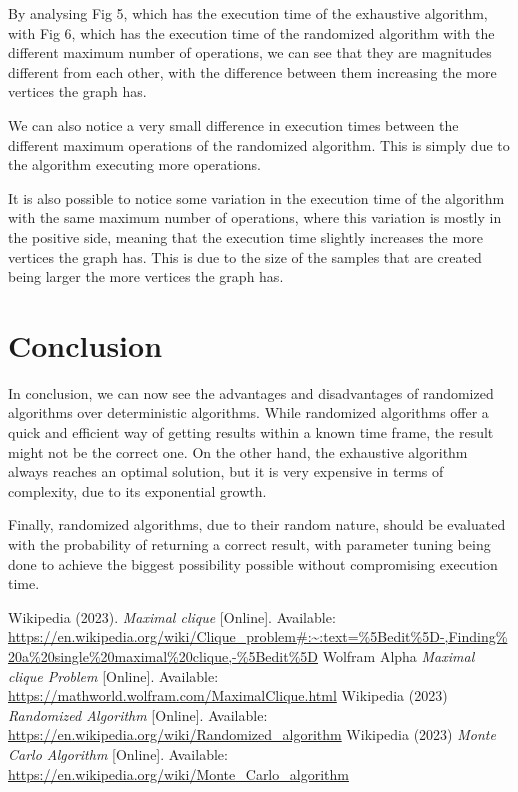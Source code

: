 \documentclass[]{revdetua}
\begin{document}
By analysing Fig 5, which has the execution time of the exhaustive algorithm, with Fig 6, which has the execution time of the randomized algorithm with the different maximum number of operations, we can see that they are magnitudes different from each other, with the difference between them increasing the more vertices the graph has.

We can also notice a very small difference in execution times between the different maximum operations of the randomized algorithm. This is simply due to the algorithm executing more operations.

It is also possible to notice some variation in the execution time of the algorithm with the same maximum number of operations, where this variation is mostly in the positive side, meaning that the execution time slightly increases the more vertices the graph has. This is due to the size of the samples that are created being larger the more vertices the graph has.

\section{Conclusion}

In conclusion, we can now see the advantages and disadvantages of randomized algorithms over deterministic algorithms. While randomized algorithms offer a quick and efficient way of getting results within a known time frame, the result might not be the correct one. On the other hand, the exhaustive algorithm always reaches an optimal solution, but it is very expensive in terms of complexity, due to its exponential growth.

Finally, randomized algorithms, due to their random nature, should be evaluated with the probability of returning a correct result, with parameter tuning being done to achieve the biggest possibility possible without compromising execution time.

\begin{thebibliography}{00}

 Wikipedia (2023). \textit{Maximal clique} [Online]. Available: \url{https://en.wikipedia.org/wiki/Clique_problem#:~:text=%5Bedit%5D-,Finding%20a%20single%20maximal%20clique,-%5Bedit%5D}
 Wolfram Alpha \textit{Maximal clique Problem} [Online]. Available: \url{https://mathworld.wolfram.com/MaximalClique.html}
 Wikipedia (2023) \textit{Randomized Algorithm} [Online]. Available: \url{https://en.wikipedia.org/wiki/Randomized_algorithm}
 Wikipedia (2023) \textit{Monte Carlo Algorithm} [Online]. Available: \url{https://en.wikipedia.org/wiki/Monte_Carlo_algorithm}
\end{thebibliography}
\end{document}
